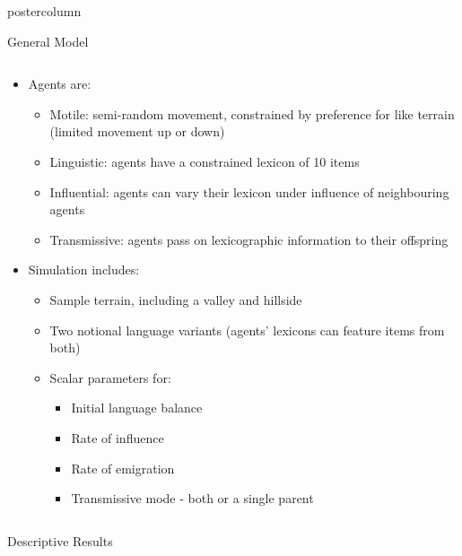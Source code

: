 \documentclass[final,hyperref={pdfpagelabels=false}]{beamer}
\begin{document}
\begin{frame}
\begin{columns}
\begin{column}{.33\textwidth}
\begin{beamercolorbox}[center,wd=\textwidth]{postercolumn}
\begin{minipage}[T]{.95\textwidth}
{            \begin{block}{General Model}
              \begin{columns}
                \begin{column}{.99\textwidth}
                  \begin{itemize}
                    \item Agents are:
                      \begin{itemize}
                        \item Motile: semi-random movement, constrained by preference for like terrain (limited movement up or down)
                        \item Linguistic: agents have a constrained lexicon of 10 items
                        \item Influential: agents can vary their lexicon under influence of neighbouring agents
                        \item Transmissive: agents pass on lexicographic information to their offspring
                      \end{itemize}
                    \item Simulation includes:
                      \begin{itemize}
                        \item Sample terrain, including a valley and hillside
                        \item Two notional language variants (agents' lexicons can feature items from both)
                        \item Scalar parameters for:
                          \begin{itemize}
                            \item Initial language balance
                            \item Rate of influence
                            \item Rate of emigration
                            \item Transmissive mode - both or a single parent
                          \end{itemize}
                      \end{itemize}
                  \end{itemize}
                \end{column}
              \end{columns}
            \end{block}
            \vfill
            \begin{block}{Descriptive Results}

\end{block}}
\end{minipage}
\end{beamercolorbox}
\end{column}
\end{columns}
\end{frame}
\end{document}
